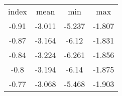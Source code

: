 \begin{tabular}{|cccc|}
\hline
index & mean & min & max\\
-0.91 & -3.011 & -5.237 & -1.807\\
-0.87 & -3.164 & -6.12 & -1.831\\
-0.84 & -3.224 & -6.261 & -1.856\\
-0.8 & -3.194 & -6.14 & -1.875\\
-0.77 & -3.068 & -5.468 & -1.903\\
\hline
\end{tabular}

